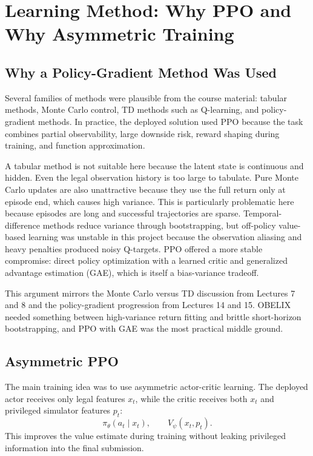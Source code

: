\documentclass[11pt]{article}
\begin{document}
\section{Learning Method: Why PPO and Why Asymmetric Training}

\subsection{Why a Policy-Gradient Method Was Used}

Several families of methods were plausible from the course material: tabular methods,
Monte Carlo control, TD methods such as Q-learning, and policy-gradient methods. In
practice, the deployed solution used PPO because the task combines partial observability,
large downside risk, reward shaping during training, and function approximation.

A tabular method is not suitable here because the latent state is continuous and hidden.
Even the legal observation history is too large to tabulate. Pure Monte Carlo updates are
also unattractive because they use the full return only at episode end, which causes high
variance. This is particularly problematic here because episodes are long and successful
trajectories are sparse. Temporal-difference methods reduce variance through
bootstrapping, but off-policy value-based learning was unstable in this project because
the observation aliasing and heavy penalties produced noisy Q-targets. PPO offered a
more stable compromise: direct policy optimization with a learned critic and generalized
advantage estimation (GAE), which is itself a bias-variance tradeoff.

This argument mirrors the Monte Carlo versus TD discussion from Lectures 7 and 8 and the
policy-gradient progression from Lectures 14 and 15. OBELIX needed something between
high-variance return fitting and brittle short-horizon bootstrapping, and PPO with GAE
was the most practical middle ground.

\subsection{Asymmetric PPO}

The main training idea was to use asymmetric actor-critic learning. The deployed actor
receives only legal features \(x_t\), while the critic receives both \(x_t\) and privileged
simulator features \(p_t\):
\[
  \pi_\theta(a_t\mid x_t),
  \qquad
  V_\psi(x_t,p_t).
\]
This improves the value estimate during training without leaking privileged information
into the final submission.
\end{document}
